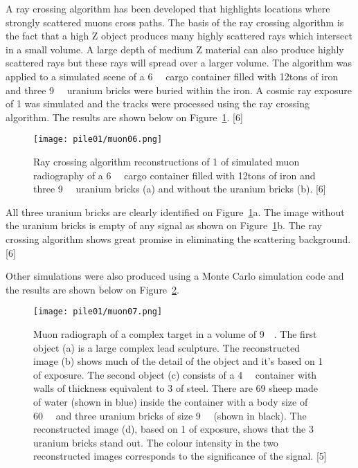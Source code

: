\documentclass[a4paper]{article}
\begin{document}
A ray crossing algorithm has been developed that highlights locations where strongly scattered
muons cross paths. The basis of the ray crossing algorithm is the fact that a high Z object produces
many highly scattered rays which intersect in a small volume. A large depth of medium Z material
can also produce highly scattered rays but these rays will spread over a larger volume. The algorithm
was applied to a simulated scene of a \unit{6}{\cubic\metre} cargo container filled with \unit{12}{tons} of iron and
three \unit{9}{\cubic{\centi\metre}} uranium bricks were buried within the iron. A cosmic ray exposure of \unit{1}{\minute} was
simulated and the tracks were processed using the ray crossing algorithm. The results are shown
below on Figure~\ref{muon06}. [6]

\begin{figure}[h!]
  \texttt{[image: pile01/muon06.png]}
  \caption{Ray crossing algorithm reconstructions of \unit{1}{\minute} of simulated muon radiography of a
\unit{6}{\cubic\metre} cargo container filled with \unit{12}{tons} of iron and
three \unit{9}{\cubic{\centi\metre}} uranium bricks (a) and without the uranium bricks (b). [6]}
  \label{muon06}
\end{figure}

All three uranium bricks are clearly identified on Figure~\ref{muon06}a. The image without the uranium bricks is
empty of any signal as shown on Figure~\ref{muon06}b. The ray crossing algorithm shows great promise in
eliminating the scattering background. [6]

Other simulations were also produced using a Monte Carlo simulation code and the results are
shown below on Figure~\ref{muon07}.

\begin{figure}[h!]
  \texttt{[image: pile01/muon07.png]}
  \caption{Muon radiograph of a complex target in a volume of \unit{9}{\cubic\metre}. The first object (a) is a
large complex lead sculpture. The reconstructed image (b) shows much of the detail of the object
and it’s based on \unit{1}{\minute} of exposure. The second object (c) consists of a \unit{4}{\cubic\metre} container with
walls of thickness equivalent to \unit{3}{\milli\metre} of steel. There are 69 sheep made of water (shown in blue)
inside the container with a body size of \unit{60}{\cubic{\centi\metre}} and three uranium bricks of 
size \unit{9}{\cubic{\centi\metre}} (shown in black). The reconstructed image (d), based 
on \unit{1}{\minute} of exposure, shows that the 3 uranium bricks stand out. The colour intensity in the two reconstructed 
images corresponds to the significance of the signal. [5]}
  \label{muon07}
\end{figure}
\end{document}
